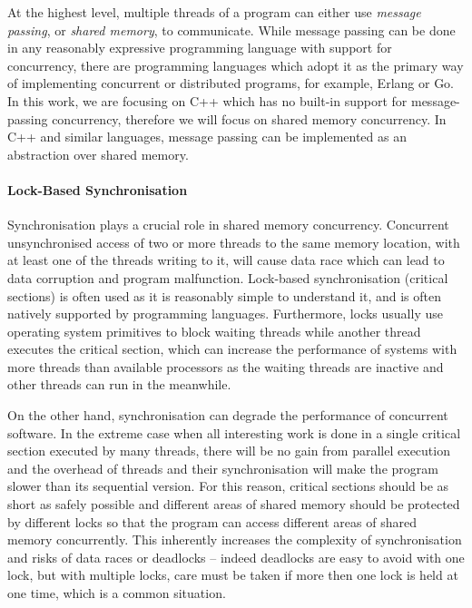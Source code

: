 At the highest level, multiple threads of a program can either use
\emph{message passing}, or \emph{shared memory}, to communicate.
While message passing can be done in any reasonably expressive programming
language with support for concurrency, there are programming languages which
adopt it as the primary way of implementing concurrent or distributed programs, for example, Erlang or Go.
In this work, we are focusing on C++ which has no built-in support for message-passing concurrency, therefore
we will focus on shared memory concurrency.
In C++ and similar languages, message passing can be implemented as an
abstraction over shared memory.

\paragraph{Lock-Based Synchronisation}

Synchronisation plays a crucial role in shared memory concurrency.
Concurrent unsynchronised access of two or more threads to the same memory location, with
at least one of the threads writing to it, will cause data race which can lead
to data corruption and program malfunction.
Lock-based synchronisation (critical sections) is often used as it is
reasonably simple to understand it, and is often natively supported by
programming languages.
Furthermore, locks usually use operating system primitives to block waiting
threads while another thread executes the critical section, which can increase
the performance of systems with more threads than available processors as the
waiting threads are inactive and other threads can run in the meanwhile.

On the other hand, synchronisation can degrade the performance of concurrent
software.
In the extreme case when all interesting work is done in a single critical
section executed by many threads, there will be no gain from parallel execution
and the overhead of threads and their synchronisation will make the program
slower than its sequential version.
For this reason, critical sections should be as short as safely possible and
different areas of shared memory should be protected by different locks so
that the program can access different areas of shared memory concurrently.
This inherently increases the complexity of synchronisation and risks of data races
or deadlocks -- indeed deadlocks are easy to avoid with one lock, but with
multiple locks, care must be taken if more then one lock is held at one time,
which is a common situation.


